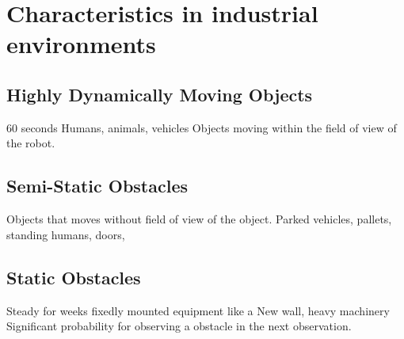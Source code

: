 \section{Characteristics in industrial environments}

\subsection{Highly Dynamically Moving Objects}
60 seconds
Humans, animals, vehicles
Objects moving within the field of view of the robot.
\subsection{Semi-Static Obstacles}
Objects that moves without field of view of the object.
Parked vehicles, pallets, standing humans, doors, 
\subsection{Static Obstacles}
Steady for weeks
fixedly mounted equipment like a New wall, heavy machinery
Significant probability for observing a obstacle in the next observation.
